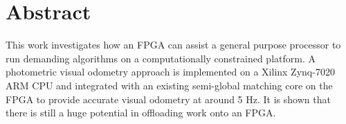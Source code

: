 \chapter*{Abstract}

This work investigates how an FPGA can assist a general purpose processor to
run demanding algorithms on a computationally constrained platform. A
photometric visual odometry approach is implemented on a Xilinx Zynq-7020 ARM
CPU and integrated with an existing semi-global matching core on the FPGA
to provide accurate visual odometry at around 5 Hz. It is shown that there is
still a huge potential in offloading work onto an FPGA.
